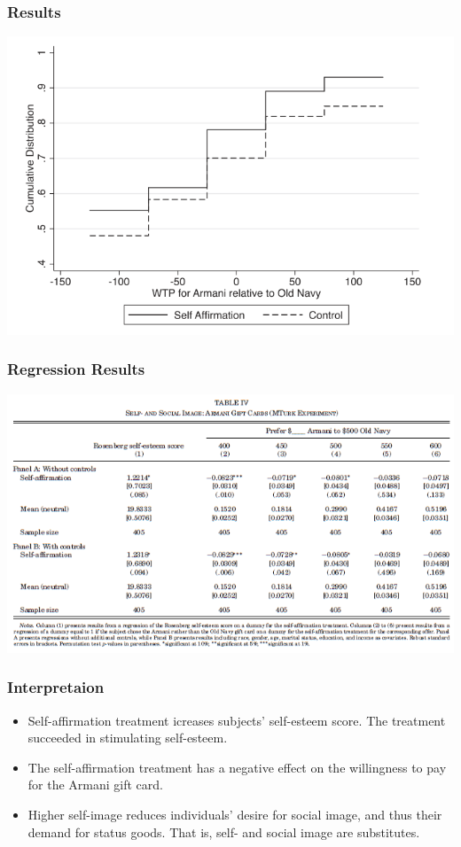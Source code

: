 \documentclass[unicode,12pt]{beamer}
\begin{document}
    \begin{frame}
        \frametitle{Results}
    
        \centerline{\includegraphics[width = \linewidth]{0717kato/result_exp3.PNG}}
    
    \end{frame}

    \begin{frame}
        \frametitle{Regression Results}
    
        \centerline{\includegraphics[width = \linewidth]{0717kato/result_exp32.PNG}}
    
    \end{frame}

    \begin{frame}
        \frametitle{Interpretaion}
    
        \begin{itemize}
            \item Self-affirmation treatment icreases subjects' self-esteem score. The treatment succeeded in stimulating self-esteem.
            \item The self-affirmation treatment has a negative effect on the willingness to pay for the Armani gift card.
            \item Higher self-image reduces individuals' desire for social image, and thus their demand for status goods. That is, self- and social image are substitutes.
        \end{itemize}
    
    \end{frame}
\end{document}
